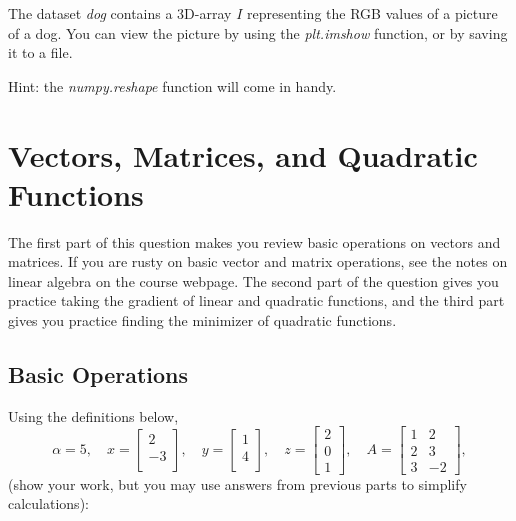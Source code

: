 \documentclass{article}
\begin{document}
The dataset \emph{dog} contains a 3D-array $I$ representing the RGB values of a picture of a dog. You can view the picture by using the \emph{plt.imshow} function, or by saving it to a file. 

Hint: the \emph{numpy.reshape} function will come in handy.




\section{Vectors, Matrices, and Quadratic Functions}

The first part of this question makes you review basic operations on vectors and matrices. If you are rusty on basic vector and matrix operations, see the notes on linear algebra on the course webpage. The second part of the question gives you practice taking the gradient of linear and quadratic functions, and the third part gives you practice finding the minimizer of quadratic functions.

\subsection{Basic Operations}

\noindent Using the definitions below,
\[
\alpha = 5,\quad
x = \left[\begin{array}{c}
2\\
-3\\
\end{array}\right], \quad
y = \left[\begin{array}{c}
1\\
4\\
\end{array}\right],\quad
z = \left[\begin{array}{c}
2\\
0\\
1\end{array}\right],
\quad
A = \left[\begin{array}{ccc}
1 & 2\\
2 & 3\\
3 & -2
\end{array}\right],
\]
 (show your work, but you may use answers from previous parts to simplify calculations):\\
\end{document}
